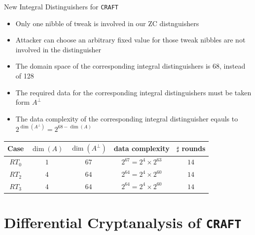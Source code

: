 \documentclass{beamer}
\begin{document}
\begin{frame}{New Integral Distinguishers for \texttt{CRAFT}}
\begin{itemize}
    \item Only one nibble of tweak is involved in our ZC distnguishers
    \item Attacker can choose an arbitrary fixed value for those tweak nibbles are not involved in the distinguisher
    \item The domain space of the corresponding integral distinguishers is 68, instead of 128
    \item The required data for the corresponding integral distinguishers must be taken form $A^{\bot}$
    \item The data complexity of the corresponding integral distinguisher eqauls to $2^{\dim(A^{\bot})} = 2^{68 - \dim(A)}$
\end{itemize}
\begin{center}
\begin{tabular}{|c||c|c|c|c|}
\hline
Case & $\dim(A)$ & $\dim(A^{\bot})$ & data complexity & $\sharp$ rounds\\
\hline
$RT_{0}$ & $1$ & $67$ & $2^{67} = 2^{4}\times 2^{63}$ & $14$\\
\hline 
$RT_{2}$ & $4$ & $64$ & $2^{64} = 2^{4}\times 2^{60}$ & $14$\\
\hline
$RT_{3}$ & $4$ & $64$ & $2^{64} = 2^{4}\times 2^{60}$ & $14$\\
\hline
\end{tabular}
\end{center}
\end{frame}

\section{Differential Cryptanalysis of \texttt{CRAFT}}
\end{document}
